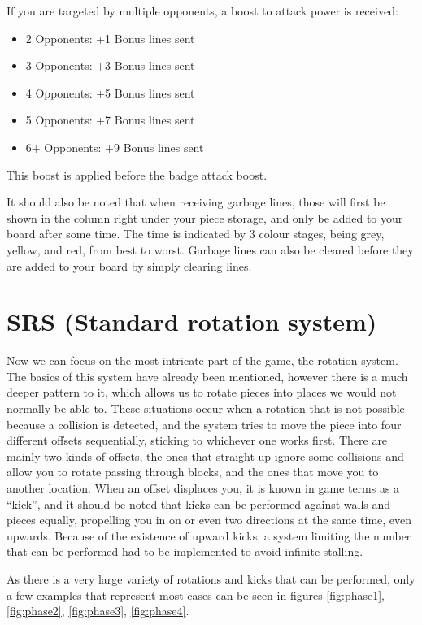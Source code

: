 If you are targeted by multiple opponents, a boost to attack power is received:
\begin{itemize}
   \item	2 Opponents:	+1 Bonus lines sent
   \item	3 Opponents:	+3 Bonus lines sent
   \item	4 Opponents:	+5 Bonus lines sent
   \item	5 Opponents:	+7 Bonus lines sent
   \item	6+ Opponents:	+9 Bonus lines sent
\end{itemize}

This boost is applied before the badge attack boost.

It should also be noted that when receiving garbage lines, those will first be shown in the column right under your piece storage, and only be added to your board after some time. The time is indicated by 3 colour stages, being grey, yellow, and red, from best to worst. Garbage lines can also be cleared before they are added to your board by simply clearing lines.

\section{SRS (Standard rotation system)}
Now we can focus on the most intricate part of the game, the rotation system. The basics of this system have already been mentioned, however there is a much deeper pattern to it, which allows us to rotate pieces into places we would not normally be able to. These situations occur when a rotation that is not possible because a collision is detected, and the system tries to move the piece into four different offsets sequentially, sticking to whichever one works first. There are mainly two kinds of offsets, the ones that straight up ignore some collisions and allow you to rotate passing through blocks, and the ones that move you to another location. When an offset displaces you, it is known in game terms as a “kick”, and it should be noted that kicks can be performed against walls and pieces equally, propelling you in on or even two directions at the same time, even upwards. Because of the existence of upward kicks, a system limiting the number that can be performed had to be implemented to avoid infinite stalling.

As there is a very large variety of rotations and kicks that can be performed, only a few examples that represent most cases can be seen in figures \ref{fig:phase1}, \ref{fig:phase2}, \ref{fig:phase3}, \ref{fig:phase4}.

